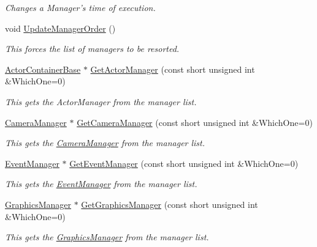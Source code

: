 \begin{DoxyCompactItemize}
\begin{DoxyCompactList}\small\item\em Changes a Manager's time of execution. \item\end{DoxyCompactList}\item 
void \hyperlink{classphys_1_1World_ae807112b9494a94a6ff0d60df0a4d424}{UpdateManagerOrder} ()
\begin{DoxyCompactList}\small\item\em This forces the list of managers to be resorted. \item\end{DoxyCompactList}\item 
\hyperlink{classphys_1_1ActorContainerBase}{ActorContainerBase} $\ast$ \hyperlink{classphys_1_1World_a8173d8959802e923f4972822435e43b6}{GetActorManager} (const short unsigned int \&WhichOne=0)
\begin{DoxyCompactList}\small\item\em This gets the ActorManager from the manager list. \item\end{DoxyCompactList}\item 
\hyperlink{classphys_1_1CameraManager}{CameraManager} $\ast$ \hyperlink{classphys_1_1World_a33ab68866da54b7f8f766d5d29171fb7}{GetCameraManager} (const short unsigned int \&WhichOne=0)
\begin{DoxyCompactList}\small\item\em This gets the \hyperlink{classphys_1_1CameraManager}{CameraManager} from the manager list. \item\end{DoxyCompactList}\item 
\hyperlink{classphys_1_1EventManager}{EventManager} $\ast$ \hyperlink{classphys_1_1World_ac20a304413b4d47f9ae657983e903a67}{GetEventManager} (const short unsigned int \&WhichOne=0)
\begin{DoxyCompactList}\small\item\em This gets the \hyperlink{classphys_1_1EventManager}{EventManager} from the manager list. \item\end{DoxyCompactList}\item 
\hyperlink{classphys_1_1GraphicsManager}{GraphicsManager} $\ast$ \hyperlink{classphys_1_1World_a15f968adb5d841da6c5eb51607a8f525}{GetGraphicsManager} (const short unsigned int \&WhichOne=0)
\begin{DoxyCompactList}\small\item\em This gets the \hyperlink{classphys_1_1GraphicsManager}{GraphicsManager} from the manager list. \item\end{DoxyCompactList}\item 

\end{DoxyCompactItemize}
